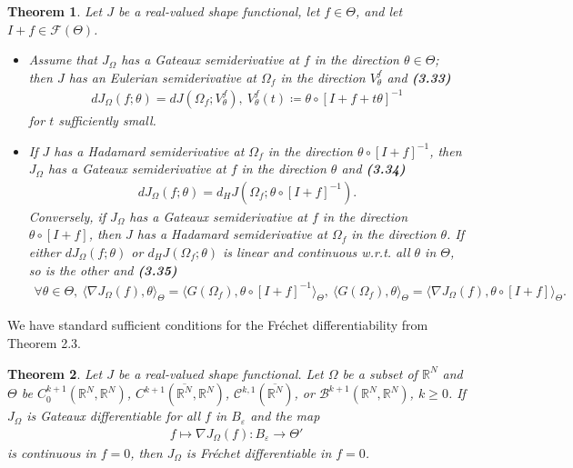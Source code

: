 \documentclass[oneside]{book}
\numberwithin{equation}{section}
\newtheorem{theorem}{Theorem}[section]
\begin{document}
\begin{theorem}
    Let $J$ be a real-valued shape functional, let $f\in\Theta$, and let $I + f\in\mathcal{F}(\Theta)$.
    \begin{itemize}
        \item[(i)] Assume that $J_\Omega$ has a Gateaux semiderivative at $f$ in the direction $\theta\in\Theta$; then $J$ has an Eulerian semiderivative at $\Omega_f$ in the direction $V_\theta^f$ and \textbf{(3.33)}
        \begin{align*}
            dJ_\Omega(f;\theta) = dJ(\Omega_f;V_\theta^f),\ V_\theta^f(t)\coloneqq\theta\circ[I + f + t\theta]^{-1}
        \end{align*}
        for $t$ sufficiently small.
        \item[(ii)] If $J$ has a Hadamard semiderivative at $\Omega_f$ in the direction $\theta\circ[I + f]^{-1}$, then $J_\Omega$ has a Gateaux semiderivative at $f$ in the direction $\theta$ and \textbf{(3.34)}
        \begin{align*}
            dJ_\Omega(f;\theta) = d_HJ\left(\Omega_f;\theta\circ[I + f]^{-1}\right).
        \end{align*}
        Conversely, if $J_\Omega$ has a Gateaux semiderivative at $f$ in the direction $\theta\circ[I + f]$, then $J$ has a Hadamard semiderivative at $\Omega_f$ in the direction $\theta$. If either $dJ_\Omega(f;\theta)$ or $d_HJ(\Omega_f;\theta)$ is linear and continuous w.r.t. all $\theta$ in $\Theta$, so is the other and \textbf{(3.35)}
        \begin{align*}
            \forall\theta\in\Theta,\ \langle\nabla J_\Omega(f),\theta\rangle_\Theta = \langle G(\Omega_f),\theta\circ[I + f]^{-1}\rangle_\Theta,\ \langle G(\Omega_f),\theta\rangle_\Theta = \langle\nabla J_\Omega(f),\theta\circ[I + f]\rangle_\Theta.
        \end{align*}
    \end{itemize}
\end{theorem}
We have standard sufficient conditions for the Fréchet differentiability from Theorem 2.3.

\begin{theorem}
    Let $J$ be a real-valued shape functional. Let $\Omega$ be a subset of $\mathbb{R}^N$ and $\Theta$ be $C_0^{k+1}(\mathbb{R}^N,\mathbb{R}^N)$, $C^{k+1}(\overline{\mathbb{R}^N},\mathbb{R}^N)$, $\mathcal{C}^{k,1}(\overline{\mathbb{R}^N})$, or $\mathcal{B}^{k+1}(\mathbb{R}^N,\mathbb{R}^N)$, $k\ge 0$. If $J_\Omega$ is Gateaux differentiable for all $f$ in $B_\varepsilon$ and the map
    \begin{align*}
        f\mapsto\nabla J_\Omega(f):B_\varepsilon\to\Theta'
    \end{align*}
    is continuous in $f = 0$, then $J_\Omega$ is Fréchet differentiable in $f = 0$.
\end{theorem}
\end{document}
